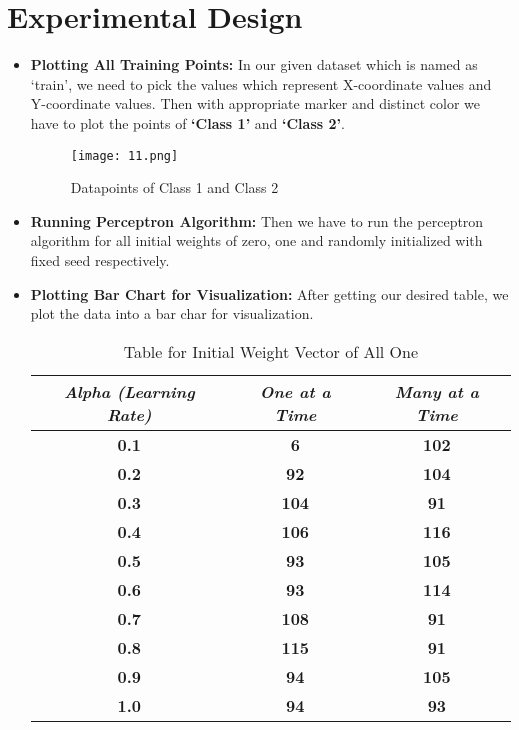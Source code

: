 \documentclass[conference]{IEEEtran}
\begin{document}
\section{Experimental Design}
\begin{itemize}  
	\item \textbf{Plotting All Training Points:}
	In our given dataset which is named as ‘train’, we need to pick the values which represent X-coordinate values and Y-coordinate values. Then with appropriate marker and distinct color we have to plot the points of \textbf{‘Class 1’} and \textbf{‘Class 2’}.\\
\begin{figure}[htbp]
\centerline{\texttt{[image: 11.png]}}
\caption{Datapoints of Class 1 and Class 2}
\label{fig}
\end{figure}
	\item \textbf{Running Perceptron Algorithm:}
Then we have to run the perceptron algorithm for all initial weights of zero, one and randomly initialized with fixed seed respectively.\\
\item \textbf{Plotting Bar Chart for Visualization:}
After getting our desired table, we plot the data into a bar char for visualization.
\begin{table}[htbp]
\caption{Table for Initial Weight Vector of All One}
\begin{center}
\begin{tabular}{|c|c|c|}
\hline
\textbf{\textit{Alpha (Learning Rate)}}& \textbf{\textit{One at a Time}}& \textbf{\textit{Many at a Time}} \\
\hline
\textbf{{0.1}}& \textbf{{6}}& \textbf{{102}} \\
\hline
\textbf{{0.2}}& \textbf{{92}}& \textbf{{104}} \\
\hline
\textbf{{0.3}}& \textbf{{104}}& \textbf{{91}} \\
\hline
\textbf{{0.4}}& \textbf{{106}}& \textbf{{116}} \\
\hline
\textbf{{0.5}}& \textbf{{93}}& \textbf{{105}} \\
\hline
\textbf{{0.6}}& \textbf{{93}}& \textbf{{114}} \\
\hline
\textbf{{0.7}}& \textbf{{108}}& \textbf{{91}} \\
\hline
\textbf{{0.8}}& \textbf{{115}}& \textbf{{91}} \\
\hline
\textbf{{0.9}}& \textbf{{94}}& \textbf{{105}} \\
\hline
\textbf{{1.0}}& \textbf{{94}}& \textbf{{93}} \\
\hline
\end{tabular}
\label{tab1}
\end{center}
\end{table}



\end{itemize}
\end{document}

